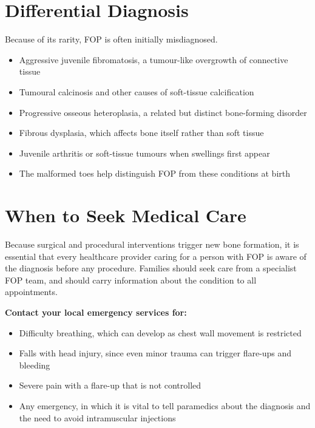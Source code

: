\section*{Differential Diagnosis}
Because of its rarity, FOP is often initially misdiagnosed.
\begin{itemize}
    \item Aggressive juvenile fibromatosis, a tumour-like overgrowth of connective tissue
    \item Tumoural calcinosis and other causes of soft-tissue calcification
    \item Progressive osseous heteroplasia, a related but distinct bone-forming disorder
    \item Fibrous dysplasia, which affects bone itself rather than soft tissue
    \item Juvenile arthritis or soft-tissue tumours when swellings first appear
    \item The malformed toes help distinguish FOP from these conditions at birth
\end{itemize}

\section*{When to Seek Medical Care}
Because surgical and procedural interventions trigger new bone formation, it is essential that every healthcare provider caring for a person with FOP is aware of the diagnosis before any procedure. Families should seek care from a specialist FOP team, and should carry information about the condition to all appointments.

\textbf{Contact your local emergency services for:}
\begin{itemize}
    \item Difficulty breathing, which can develop as chest wall movement is restricted
    \item Falls with head injury, since even minor trauma can trigger flare-ups and bleeding
    \item Severe pain with a flare-up that is not controlled
    \item Any emergency, in which it is vital to tell paramedics about the diagnosis and the need to avoid intramuscular injections
\end{itemize}

